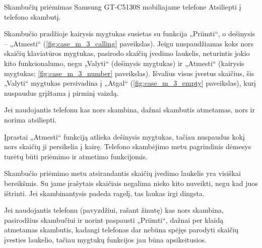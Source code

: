 \begin{xcase}{Skambučių priėmimas Samsung GT-C5130S mobiliajame telefone}
  \xcgoal
  {
    Atsiliepti į telefono skambutį.
  }
  
  \xctools
  {
    Skambučio pradžioje kairysis mygtukas susietas su funkcija „Priimti“, o
    dešinysis – „Atmesti“ (\ref{fig:case_m_3_calling} paveikslas). Jeigu nuspaudžiamas
    koks nors skaičių klaviatūros mygtukas, pasirodo skaičių įvedimo laukelis,
    neturintis jokio kito funkcionalumo, negu „Valyti“ (dešinysis mygtukas) ir
    „Atmesti“ (kairysis mygtukas; \ref{fig:case_m_3_number} paveikslas). Išvalius
    visus įvestus skaičius, šis „Valyti“ mygtukas persivadina į „Atgal“
    (\ref{fig:case_m_3_empty} paveikslas), kurį nuspaudus grįžtama į pirminį vaizdą.

    {
    }
  }
  
  \xcresult
  {
    Jei naudojantis telefonu kas nors skambina, dažnai skambutis atmetamas,
    nors ir norima atsiliepti.
  }
  
  \xcprinciples
  {
    {
      Įprastai „Atmesti“ funkciją atlieka dešinysis mygtukas, tačiau
      nuspaudus kokį nors skaičių ji persikelia į kairę. Telefono
      skambėjimo metu pagrindinis dėmesys turėtų būti priėmimo ir atmetimo
      funkcijomis.
    }
  }
  
  \xcthoughts
  {
    Skambučio priėmimo metu atsirandantis skaičių įvedimo laukelis yra
    visiškai bereikšmis. Su jame įrašytais skaičiais negalima nieko kito
    nuveikti, negu kad juos ištrinti. Jei skambinantysis padeda ragelį,
    tas laukas irgi dingsta.

    Jei naudojantis telefonu (pavyzdžiui, rašant žinutę) kas nors skambina,
    pasirodžius skambučiui ir norint paspausti „Priimti“, dažnai per klaidą
    atmetamas skambutis, kadangi telefonas dar nebūna spėjęs parodyti
    skaičių įvesties laukelio, tačiau mygtukų funkcijos jau būna
    apsikeitusios.
  }
\end{xcase}
